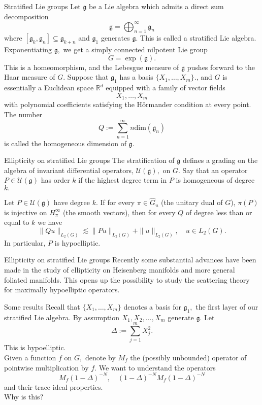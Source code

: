 \documentclass{beamer}
\numberwithin{equation}{section}
\theoremstyle{plain}
\theoremstyle{plain}
\theoremstyle{definition}
\theoremstyle{plain}
\theoremstyle{plain}
\theoremstyle{definition}
\newcommand{\Rl}{\mathbb{R}}
\newcommand{\Uc}{\mathcal{U}}
\newcommand{\gf}{\mathfrak{g}}
\begin{document}
\begin{frame}{Stratified Lie groups}
  Let $\gf$ be a Lie algebra which admits a direct sum decomposition
  \[
    \gf = \bigoplus_{n=1}^\infty \gf_n
  \]
  where $[\gf_k,\gf_n] \subseteq \gf_{k+n}$ and $\gf_1$ generates $\gf.$
  This is called a stratified Lie algebra. Exponentiating $\gf,$
  we get a simply connected nilpotent Lie group
  \[
    G = \exp(\gf).
  \]
  This is a homeomorphism, and the Lebesgue measure of $\gf$ pushes forward to the Haar measure of $G.$
  Suppose that $\gf_1$ has a basis $\{X_1,\ldots,X_m\}.$, and $G$ is essentially a Euclidean space $\Rl^d$ equipped with a family of vector fields
  \[
    X_1,\ldots,X_m
  \]
  with polynomial coefficients satisfying the H\"ormander condition at every point.
  The number
  \[
    Q := \sum_{n=1}^\infty n\mathrm{dim}(\gf_n)
  \]
  is called the homogeneous dimension of $\gf.$
\end{frame}

\begin{frame}{Ellipticity on stratified Lie groups}
  The stratification of $\gf$ defines a grading on the algebra of invariant differential operators, $\Uc(\gf),$ on $G.$
  Say that an operator $P\in \Uc(\gf)$ has order $k$ if the highest degree term in $P$ is homogeneous of degree $k.$

  \begin{theorem}
    Let $P \in \Uc(\gf)$ have degree $k.$ If for every $\pi \in \widehat{G}_u$ (the unitary dual of $G$), $\pi(P)$
    is injective on $H^{\infty}_\pi$ (the smooth vectors), then for every $Q$ of degree less than or equal to $k$ we have
    \[
      \|Qu\|_{L_2(G)} \lesssim \|Pu\|_{L_2(G)}+\|u\|_{L_2(G)},\quad u\in L_2(G).
    \]
    In particular, $P$ is hypoelliptic.
  \end{theorem}
\end{frame}

\begin{frame}{Ellipticity on stratified Lie groups}
  Recently some substantial advances have been made in the study of ellipticity on Heisenberg manifolds and more general foliated manifolds.
  \pause
  This opens up the possibility to study the scattering theory for maximally hypoelliptic operators.
\end{frame}

\begin{frame}{Some results}
Recall that $\{X_1,\ldots,X_m\}$ denotes a basis for $\gf_1,$ the first layer of our stratified Lie algebra. By assumption $X_1,X_2,\ldots,X_m$ generate $\gf.$ Let
\[
  \Delta := \sum_{j=1}^m X_j^2.
\]
This is hypoelliptic.\\
\pause
Given a function $f$ on $G,$ denote by $M_f$ the (possibly unbounded) operator of pointwise multiplication by $f.$ We want to understand the operators
\[
  M_f(1-\Delta)^{-N},\quad (1-\Delta)^{-N}M_f(1-\Delta)^{-N}
\]
and their trace ideal properties.\\
\pause
Why is this?
\end{frame}
\end{document}
